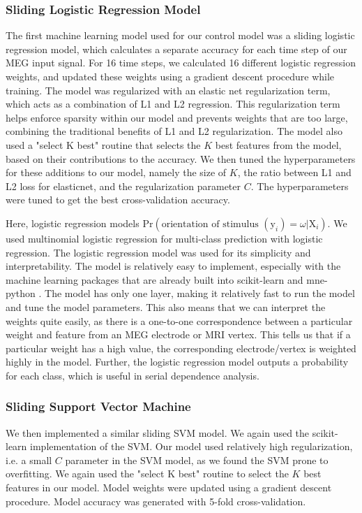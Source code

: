 \documentclass[../main.tex]{subfiles}
\begin{document}
\subsubsection{Sliding Logistic Regression Model}
The first machine learning model used for our control model was a sliding logistic regression model, which calculates a separate accuracy for each time step of our MEG input signal. For 16 time steps, we calculated 16 different logistic regression weights, and updated these weights using a gradient descent procedure while training. The model was regularized with an elastic net regularization term, which acts as a combination of L1 and L2 regression. This regularization term helps enforce sparsity within our model and prevents weights that are too large, combining the traditional benefits of L1 and L2 regularization. The model also used a "select K best" routine that selects the $K$ best features from the model, based on their contributions to the accuracy. We then tuned the hyperparameters for these additions to our model, namely the size of $K$, the ratio between L1 and L2 loss for elasticnet, and the regularization parameter $C$. The hyperparameters were tuned to get the best cross-validation accuracy.

Here, logistic regression models $\mathrm{Pr}(\textrm{orientation of stimulus } (\mathrm{y}_i) = \omega | \mathrm{X}_i)$. We used multinomial logistic regression for multi-class prediction with logistic regression. The logistic regression model was used for its simplicity and interpretability. The model is relatively easy to implement, especially with the machine learning packages that are already built into scikit-learn \citep{scikit-learn} and mne-python \citep{mne}. The model has only one layer, making it relatively fast to run the model and tune the model parameters. This also means that we can interpret the weights quite easily, as there is a one-to-one correspondence between a particular weight and feature from an MEG electrode or MRI vertex. This tells us that if a particular weight has a high value, the corresponding electrode/vertex is weighted highly in the model. Further, the logistic regression model outputs a probability for each class, which is useful in serial dependence analysis.

\subsubsection{Sliding Support Vector Machine}
We then implemented a similar sliding SVM model. We again used the scikit-learn \citep{scikit-learn} implementation of the SVM. Our model used relatively high regularization, i.e. a small $C$ parameter in the SVM model, as we found the SVM prone to overfitting. We again used the "select K best" routine to select the $K$ best features in our model. Model weights were updated using a gradient descent procedure. Model accuracy was generated with 5-fold cross-validation. 
\end{document}
